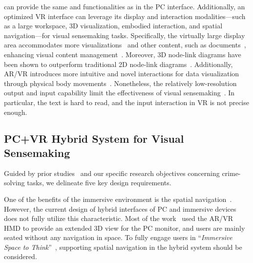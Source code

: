  can provide the same  and functionalities as in the PC interface. 
Additionally, an optimized VR interface can leverage its display and interaction modalities---such as a large workspace, 3D visualization, embodied interaction, and spatial navigation---for visual sensemaking tasks.
Specifically, the virtually large display area accommodates more visualizations~\cite{horak2018david} and other content, such as documents~\cite{tong2023towards}, enhancing visual content management~\cite{satriadi2020maps,lisle2020evaluating,yang2020virtual}.
Moreover, 3D node-link diagrams have been shown to outperform traditional 2D node-link diagrams~\cite{kwon2016study}.
Additionally, AR/VR introduces more intuitive and novel interactions for data visualization through physical body movements~\cite{cordeil2017imaxes,liu2023datadancing,tong2022exploring,yang2020tilt,in2023table}.
Nonetheless, the relatively low-resolution output and input capability limit the effectiveness of visual sensemaking~\cite{feiner1991hybrid}. 
In particular, the text is hard to read, and the input interaction in VR is not precise enough.



\subsection{PC+VR Hybrid System for Visual Sensemaking}

Guided by prior studies~\cite{lisle2020evaluating,hubenschmid2022relive,hubenschmid2021towards,davidson2022exploring,tong2023towards} and our specific research objectives concerning crime-solving tasks, we delineate five key design requirements.

\label{req:r1}
One of the benefits of the immersive environment is the spatial navigation~\cite{lisle2020evaluating,hayatpur2020datahop,li2023gestureexplorer}. However, the current design of hybrid interfaces of PC and immersive devices does not fully utilize this characteristic. 
Most of the work~\cite{immersed2023,wang2020towards} used the AR/VR HMD to provide an extended 3D view for the PC monitor, and users are mainly seated without any navigation in space. 
To fully engage users in ``\textit{Immersive Space to Think}''~\cite{lisle2020evaluating}, supporting spatial navigation in the hybrid system should be considered. 

